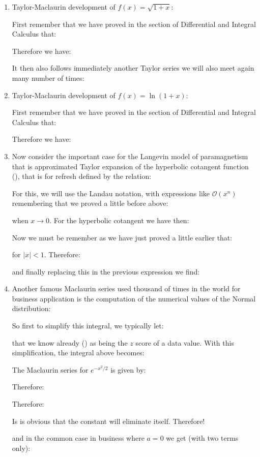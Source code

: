 \begin{enumerate}
		
		\item  Taylor-Maclaurin development of $f(x)=\sqrt{1+x}$:
		
		First remember that we have proved in the section of Differential and Integral Calculus that:
		
		Therefore we have:
		
		It then also follows immediately another Taylor series we will also meet again many  number of times:
		
		
		\item  Taylor-Maclaurin development of $f(x)=\ln(1+x)$:
		
		First remember that we have proved in the section of Differential and Integral Calculus that:
		
		Therefore we have:
		
		
		\item  Now consider the important case for the Langevin model of paramagnetism that is approximated Taylor expansion of the hyperbolic cotangent function (), that is for refresh defined by the relation:
		
		For this, we will use the Landau notation, with expressions like $\mathcal{O}(x^n)$ remembering that we proved a little before above:
		
		when $x \rightarrow 0$.
		For the hyperbolic cotangent we have then:
		
		Now we must be remember as we have just proved a little earlier that:
		
		for $\vert x \vert < 1$. Therefore:
		
		and finally replacing this in the previous expression we find:
		
		
		\item  Another famous Maclaurin series used thousand of times in the world for business application is the computation of the numerical values of the Normal distribution:
		
		So first to simplify this integral, we typically let:
		
		that we know already () as being the $z$ score of a data value. With this simplification, the integral above becomes:
		
		The Maclaurin series for $e^{-x^2/2}$ is given by:
		
		Therefore:
		
		Therefore:
		
		Is is obvious that the constant will eliminate itself. Therefore!
		
		and in the common case in business where $a=0$ we get (with two terms only):
		
	\end{enumerate}
	

